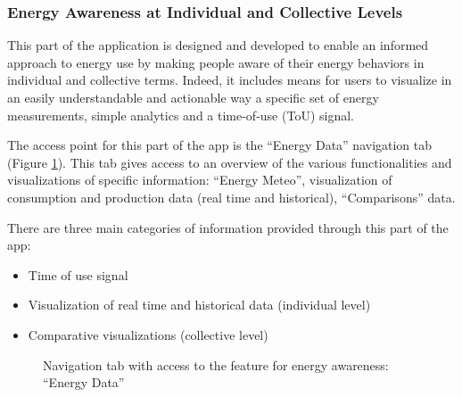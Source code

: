 \subsubsection{Energy Awareness at Individual and Collective Levels}
\label{sec:energydata}

This part of the application is designed and developed to enable an informed approach to energy use by making people aware of their
energy behaviors in individual and collective terms. Indeed, it includes means for users to visualize in an easily
understandable and actionable way a specific set of energy measurements, simple analytics and a time-of-use (ToU) signal.

The access point for this part of the app is the ``Energy Data'' navigation tab (Figure \ref{fig:tab}). This tab gives access to an
overview of the various functionalities and visualizations of specific information: ``Energy Meteo'', visualization of consumption and production data (real time and historical),
``Comparisons'' data.

There are three main categories of information provided through this part of the app:
\begin{itemize}
 \item Time of use signal
 \item Visualization of real time and historical data (individual level)
 \item Comparative visualizations (collective level)
\end{itemize}

\begin{figure}[htb]
\centering
{}
\caption{Navigation tab with access to the feature for energy awareness: ``Energy Data''}\label{fig:tab}
\end{figure}

